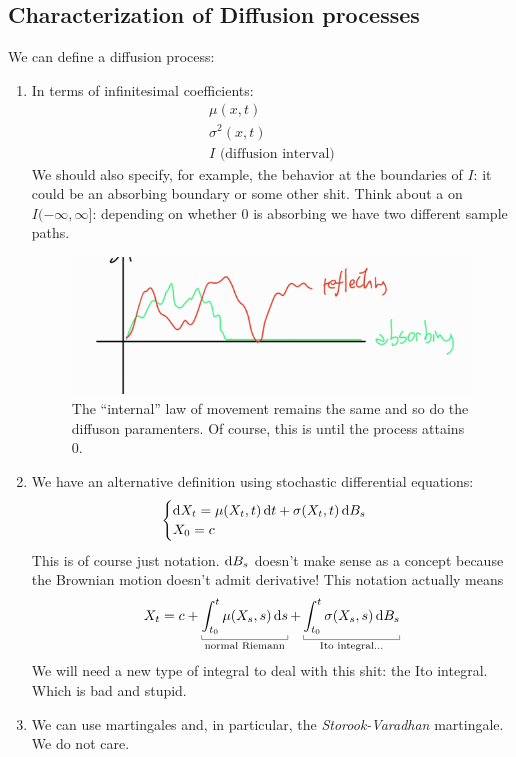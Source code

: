 \documentclass[12pt]{report}
\begin{document}
\subsection{Characterization of Diffusion processes}
We can define a diffusion process:
\begin{enumerate}
	\item In terms of infinitesimal coefficients:
	\begin{equation*}
		\begin{array}{c}
			\mu(x,t)\\
			\sigma^{2}(x,t)\\
			I\text{ (diffusion interval)}
		\end{array}
	\end{equation*}
	We should also specify, for example, the behavior at the boundaries of $I$: it could be an absorbing boundary or some other shit.
	Think about a \bwm{} on $I(-\infty,\infty]$: depending on whether 0 is absorbing we have two different sample paths.
	\begin{figure}[H]
		\centering
		\includegraphics[width=0.5\linewidth]{img/screenshot049}
		\caption{The ``internal'' law of movement remains the same and so do the diffuson paramenters. Of course, this is until the process attains 0.}
		\label{fig:screenshot049}
	\end{figure}
	\item We have an alternative definition using stochastic differential equations:
	\begin{equation*}
		\begin{cases}
			\mathop{}\!\mathrm{d} X_{t}=\mu(X_{t},t)\mathop{}\!\mathrm{d} t+\sigma(X_{t},t)\mathop{}\!\mathrm{d} B_{s}\\
			X_{0}=c
		\end{cases}
	\end{equation*}
	This is of course just notation. $\mathop{}\!\mathrm{d} B_{s}$ doesn't make sense as a concept because the Brownian motion doesn't admit derivative! This notation actually means
	\begin{equation*}
		X_{t}=c+\ubracketthin{\int_{t_{0}}^{t}\mu(X_{s},s)\ds}_{\claptext{normal Riemann}}+\ubracketthin{\int_{t_{0}}^{t}\sigma(X_{s},s)\dif B_{s}}_{\claptext{Ito integral...}}
	\end{equation*}
	We will need a new type of integral to deal with this shit: the Ito integral. Which is bad and stupid.
	\item We can use martingales and, in particular, the \emph{Storook-Varadhan} martingale. We do not care.
\end{enumerate}
\end{document}
